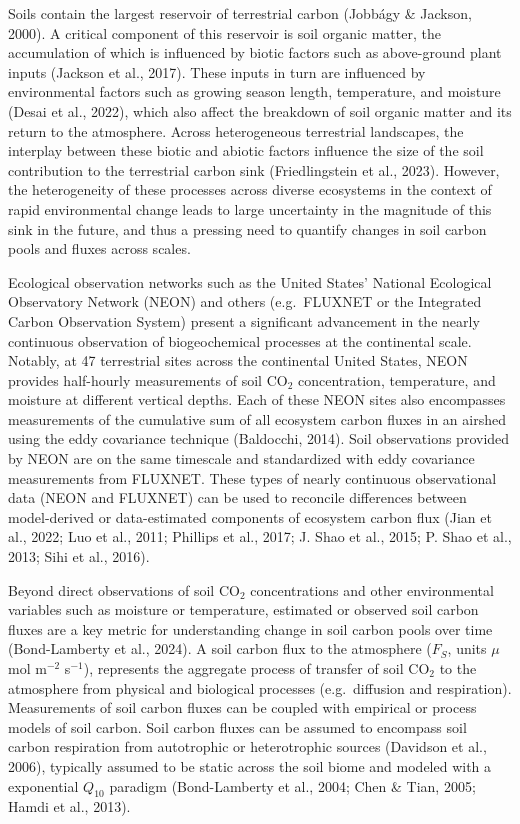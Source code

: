 \documentclass[
  letterpaper,
  DIV=11,
  numbers=noendperiod]{scrartcl}
\begin{document}
Soils contain the largest reservoir of terrestrial carbon (Jobbágy \&
Jackson, 2000). A critical component of this reservoir is soil organic
matter, the accumulation of which is influenced by biotic factors such
as above-ground plant inputs (Jackson et al., 2017). These inputs in
turn are influenced by environmental factors such as growing season
length, temperature, and moisture (Desai et al., 2022), which also
affect the breakdown of soil organic matter and its return to the
atmosphere. Across heterogeneous terrestrial landscapes, the interplay
between these biotic and abiotic factors influence the size of the soil
contribution to the terrestrial carbon sink (Friedlingstein et al.,
2023). However, the heterogeneity of these processes across diverse
ecosystems in the context of rapid environmental change leads to large
uncertainty in the magnitude of this sink in the future, and thus a
pressing need to quantify changes in soil carbon pools and fluxes across
scales.

Ecological observation networks such as the United States' National
Ecological Observatory Network (NEON) and others (e.g.~FLUXNET or the
Integrated Carbon Observation System) present a significant advancement
in the nearly continuous observation of biogeochemical processes at the
continental scale. Notably, at 47 terrestrial sites across the
continental United States, NEON provides half-hourly measurements of
soil CO\(_{2}\) concentration, temperature, and moisture at different
vertical depths. Each of these NEON sites also encompasses measurements
of the cumulative sum of all ecosystem carbon fluxes in an airshed using
the eddy covariance technique (Baldocchi, 2014). Soil observations
provided by NEON are on the same timescale and standardized with eddy
covariance measurements from FLUXNET. These types of nearly continuous
observational data (NEON and FLUXNET) can be used to reconcile
differences between model-derived or data-estimated components of
ecosystem carbon flux (Jian et al., 2022; Luo et al., 2011; Phillips et
al., 2017; J. Shao et al., 2015; P. Shao et al., 2013; Sihi et al.,
2016).

Beyond direct observations of soil CO\(_{2}\) concentrations and other
environmental variables such as moisture or temperature, estimated or
observed soil carbon fluxes are a key metric for understanding change in
soil carbon pools over time (Bond-Lamberty et al., 2024). A soil carbon
flux to the atmosphere (\(F_{S}\), units \(\mu\)mol m\(^{-2}\)
s\(^{-1}\)), represents the aggregate process of transfer of soil
CO\(_{2}\) to the atmosphere from physical and biological processes
(e.g.~diffusion and respiration). Measurements of soil carbon fluxes can
be coupled with empirical or process models of soil carbon. Soil carbon
fluxes can be assumed to encompass soil carbon respiration from
autotrophic or heterotrophic sources (Davidson et al., 2006), typically
assumed to be static across the soil biome and modeled with a
exponential \(Q_{10}\) paradigm (Bond-Lamberty et al., 2004; Chen \&
Tian, 2005; Hamdi et al., 2013).
\end{document}
